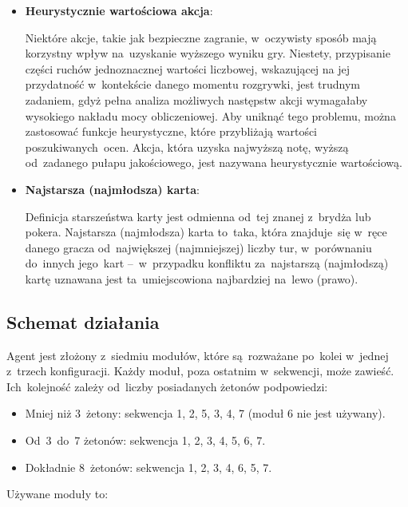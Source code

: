 \documentclass[declaration,shortabstract,inz]{iithesis}
\begin{document}
\begin{itemize}
	\item \textbf{Heurystycznie wartościowa akcja}:
	
	Niektóre akcje, takie jak bezpieczne zagranie, w~oczywisty sposób mają korzystny wpływ na~uzyskanie wyższego wyniku gry. Niestety, przypisanie części ruchów jednoznacznej wartości liczbowej, wskazującej na jej przydatność w~kontekście danego momentu rozgrywki, jest trudnym zadaniem, gdyż pełna analiza możliwych następstw akcji wymagałaby wysokiego nakładu mocy obliczeniowej. Aby uniknąć tego problemu, można zastosować funkcje heurystyczne, które przybliżają wartości poszukiwanych~ocen. Akcja, która uzyska najwyższą notę, wyższą od~zadanego pułapu jakościowego, jest nazywana heurystycznie wartościową.
	
	\item \textbf{Najstarsza (najmłodsza) karta}:
	
	Definicja starszeństwa karty jest odmienna od~tej znanej z~brydża lub pokera. Najstarsza (najmłodsza) karta to~taka, która znajduje~się w~ręce danego gracza od~największej (najmniejszej) liczby tur, w~porównaniu do~innych jego~kart --~w~przypadku konfliktu za~najstarszą (najmłodszą) kartę uznawana jest ta~umiejscowiona najbardziej na~lewo (prawo).

\end{itemize}

\subsection*{Schemat działania}

Agent jest złożony z~siedmiu modułów, które są~rozważane po~kolei w~jednej z~trzech konfiguracji. Każdy moduł, poza ostatnim w~sekwencji, może zawieść. Ich~kolejność zależy od~liczby posiadanych żetonów podpowiedzi:

\begin{itemize}
	\item Mniej niż 3~żetony: sekwencja 1, 2, 5, 3, 4, 7 (moduł 6 nie jest używany).
	\item Od~3~do~7 żetonów: sekwencja 1, 2, 3, 4, 5, 6, 7.
	\item Dokładnie 8~żetonów: sekwencja 1, 2, 3, 4, 6, 5, 7.
\end{itemize}

\noindent Używane moduły to:
\end{document}
